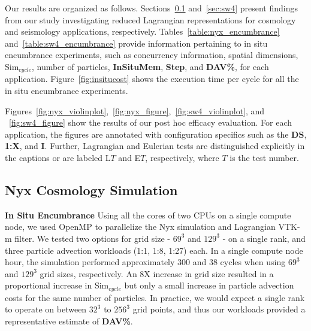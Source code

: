 Our results are organized as follows.
%
Sections~\ref{sec:nyx} and~\ref{sec:sw4} present findings from our study investigating reduced Lagrangian representations for cosmology and seismology applications, respectively.
%
%
%
Tables~\ref{table:nyx_encumbrance} and~\ref{table:sw4_encumbrance} provide information pertaining to in situ encumbrance experiments, such as concurrency information, spatial dimensions, Sim$_{cycle}$, number of particles, \textbf{InSituMem}, \textbf{Step}, and \textbf{DAV\%}, for each application. 
%
Figure~\ref{fig:insitucost} shows the execution time per cycle for all the in situ encumbrance experiments. %
%

%
Figures~\ref{fig:nyx_violinplot},~\ref{fig:nyx_figure},~\ref{fig:sw4_violinplot}, and ~\ref{fig:sw4_figure} show the results of our post hoc efficacy evaluation.
%
For each application, the figures are annotated with configuration specifics such as the \textbf{DS}, \textbf{1:X}, and \textbf{I}.
%
Further, Lagrangian and Eulerian tests are distinguished explicitly in the captions or are labeled L$T$ and E$T$, respectively, where $T$ is the test number.
%

\vspace{-1mm}
\subsection{Nyx Cosmology Simulation}
\label{sec:nyx}
\noindent\textbf{In Situ Encumbrance}
Using all the cores of two CPUs on a single compute node, we used OpenMP to parallelize the Nyx simulation and Lagrangian VTK-m filter.
%
We tested two options for grid size - $69^{3}$ and $129^{3}$ - on a single rank, and three particle advection workloads (1:1, 1:8, 1:27) each.
%
In a single compute node hour, the simulation performed approximately 300 and 38 cycles when using $69^{3}$ and $129^{3}$ grid sizes, respectively.
%
%
An 8X increase in grid size resulted in a proportional increase in Sim$_{cycle}$ but only a small increase in particle advection costs for the same number of particles.
%
In practice, we would expect a single rank to operate on between $32^{3}$ to $256^{3}$ grid points, and thus our workloads provided a representative estimate of \textbf{DAV\%}.
%


